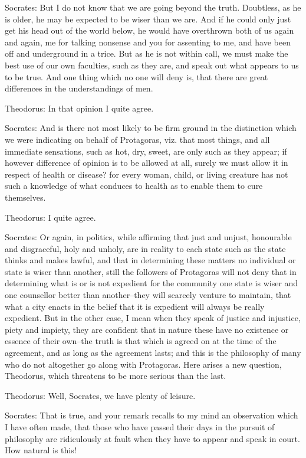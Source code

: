 Socrates: But I do not know that we are going beyond the truth.
Doubtless, as he is older, he may be expected to be wiser than we are.
And if he could only just get his head out of the world below, he would
have overthrown both of us again and again, me for talking nonsense and
you for assenting to me, and have been off and underground in a trice.
But as he is not within call, we must make the best use of our own
faculties, such as they are, and speak out what appears to us to be
true. And one thing which no one will deny is, that there are great
differences in the understandings of men.

Theodorus: In that opinion I quite agree.

Socrates: And is there not most likely to be firm ground in the
distinction which we were indicating on behalf of Protagoras, viz. that
most things, and all immediate sensations, such as hot, dry, sweet,
are only such as they appear; if however difference of opinion is to be
allowed at all, surely we must allow it in respect of health or disease?
for every woman, child, or living creature has not such a knowledge of
what conduces to health as to enable them to cure themselves.

Theodorus: I quite agree.

Socrates: Or again, in politics, while affirming that just and unjust,
honourable and disgraceful, holy and unholy, are in reality to each
state such as the state thinks and makes lawful, and that in determining
these matters no individual or state is wiser than another, still the
followers of Protagoras will not deny that in determining what is or is
not expedient for the community one state is wiser and one counsellor
better than another--they will scarcely venture to maintain, that what
a city enacts in the belief that it is expedient will always be really
expedient. But in the other case, I mean when they speak of justice and
injustice, piety and impiety, they are confident that in nature these
have no existence or essence of their own--the truth is that which is
agreed on at the time of the agreement, and as long as the agreement
lasts; and this is the philosophy of many who do not altogether go along
with Protagoras. Here arises a new question, Theodorus, which threatens
to be more serious than the last.

Theodorus: Well, Socrates, we have plenty of leisure.

Socrates: That is true, and your remark recalls to my mind an
observation which I have often made, that those who have passed their
days in the pursuit of philosophy are ridiculously at fault when they
have to appear and speak in court. How natural is this!

